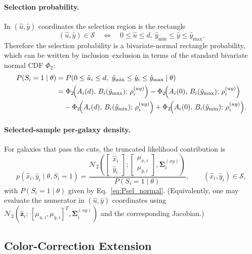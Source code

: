 \paragraph{Selection probability.}
In $(\hat u,\hat y)$ coordinates the selection region is the rectangle
\[
(\hat u,\hat y)\in\mathcal S
\quad \Longleftrightarrow \quad
0\le \hat u\le d,\ \hat y_{\min}\le \hat y\le \hat y_{\max}.
\]
Therefore the selection probability is a bivariate-normal rectangle
probability, which can be written by inclusion--exclusion in terms of the
standard bivariate normal CDF $\Phi_2$:
\begin{equation}
\label{eq:Psel_normal}
\begin{aligned}
P(S_i=1\mid\theta)
&=P(0\le \hat u_i\le d,\ \hat y_{\min}\le \hat y_i\le \hat y_{\max}\mid\theta)\\
&=
\Phi_2\!\Bigl(A_i(d),\,B_i(\hat y_{\max});\,\rho^{(uy)}_i\Bigr)
-\Phi_2\!\Bigl(A_i(0),\,B_i(\hat y_{\max});\,\rho^{(uy)}_i\Bigr)\\
&\quad
-\Phi_2\!\Bigl(A_i(d),\,B_i(\hat y_{\min});\,\rho^{(uy)}_i\Bigr)
+\Phi_2\!\Bigl(A_i(0),\,B_i(\hat y_{\min});\,\rho^{(uy)}_i\Bigr).
\end{aligned}
\end{equation}

\paragraph{Selected-sample per-galaxy density.}
For galaxies that pass the cuts, the truncated likelihood contribution is
\begin{equation}
p(\hat x_i,\hat y_i\mid \theta, S_i=1)
=
\frac{
\mathcal N_2\!\left(
\begin{bmatrix}\hat x_i\\ \hat y_i\end{bmatrix};
\begin{bmatrix}\mu_{x,i}\\ \mu_{y,i}\end{bmatrix},
\boldsymbol\Sigma^{(xy)}_i
\right)
}{
P(S_i=1\mid\theta)
},
\qquad (\hat x_i,\hat y_i)\in\mathcal S,
\end{equation}
with $P(S_i=1\mid\theta)$ given by Eq.~\eqref{eq:Psel_normal}. (Equivalently,
one may evaluate the numerator in $(\hat u,\hat y)$ coordinates using
$\mathcal N_2(\hat{\boldsymbol z}_i;\,[\mu_{u,i},\mu_{y,i}]^T,\boldsymbol\Sigma^{(uy)}_i)$ and the corresponding Jacobian.)


\subsection{Color-Correction Extension}
\label{sec:app1:color}

